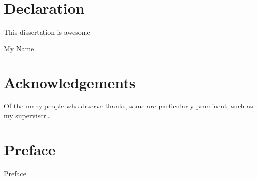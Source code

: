 \chapter*{Declaration}
\thispagestyle{empty}
  This dissertation is awesome
  \vspace*{1cm}
  \begin{flushright}
    My Name
  \end{flushright}
\clearpage

\chapter*{Acknowledgements}
\thispagestyle{empty}
Of the many people who deserve thanks, some are particularly prominent,
such as my supervisor\dots
\clearpage

\chapter*{Preface}
\thispagestyle{empty}
Preface
\clearpage

\listoftodos

\tableofcontents

